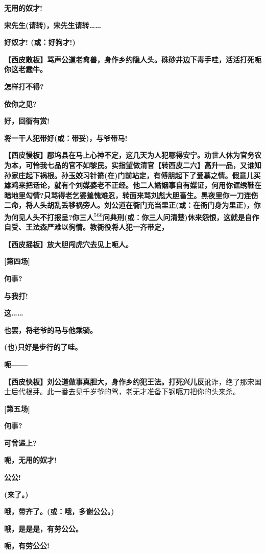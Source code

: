 \textbf{无用的奴才!}

\textbf{宋先生(请转)，宋先生请转\ldots{}\ldots{}}

\textbf{好奴才! (或：好狗才!)}

\textbf{【西皮散板】骂声公道老禽兽，身作乡约隐人头。硃砂井边下毒手哇，活活打死呃你这老蠢牛。}

\textbf{怎样打不得?}

\textbf{依你之见?}

\textbf{好，回衙有赏!}

\textbf{将一干人犯带好(或：带妥)，与爷带马!}

\textbf{【西皮慢板】郿坞县在马上心神不定，这几天为人犯哪得安宁。劝世人休为官务农为本，可怜我七品的官不如黎民。实指望做清官【转西皮二六】高升一品，又谁知孙家庄起下祸根。孙玉姣习针黹(在)门前站定，有傅朋起下了爱慕之情。假意儿买雄鸡来把话论，就有个刘媒婆老不正经。他二人婚姻事自有媒证，何用你诓绣鞋在暗地里勾情?只骂得老乞婆羞愧难忍，转面来骂刘彪大胆畜生。黑夜里你一刀连伤二命，将人头胡乱丢移祸旁人。刘公道在衙门充当里正(或：在衙门身为里正)，你为何见人头不打报呈?你三人}\protect\hyperlink{fn566}{\textsuperscript{566}}\textbf{问典刑(或：你三人问清楚)休来怨恨，这就是自作自受、王法森严难以徇情。教衙役将人犯一齐带定，}

\textbf{【西皮摇板】放大胆闯虎穴去见上呃人。}

\textbf{{[}第四场{]}}

\textbf{何事?}

\textbf{与我打!}

\textbf{这\ldots{}\ldots{}}

\textbf{也罢，将老爷的马与他乘骑。}

\textbf{(也)只好是步行的了哇。}

\textbf{呃------}

\textbf{【西皮快板】刘公道做事真胆大，身作乡约犯王法。打死兴儿反}讹诈，绝了那宋国士后代根芽。此一番去见千岁爷的驾，老无才准备下钢\textbf{呃}刀把你的头来杀。

\textbf{{[}第五场{]}}

\textbf{何事?}

\textbf{可曾递上?}

\textbf{呃，无用的奴才!}

\textbf{公公!}

\textbf{(来了。)}

\textbf{哦，带齐了。(或：哦，多谢公公。)}

\textbf{哦，是是是，有劳公公。}

\textbf{呃，有劳公公!}

